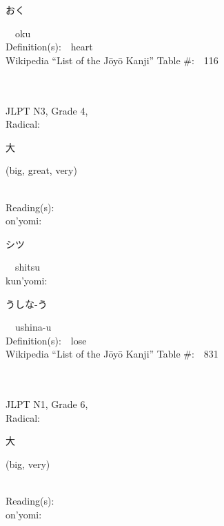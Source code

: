 \begin{multicols}{2}
{\hspace*{2em}}{\begin{CJK}{UTF8}{min} おく \end{CJK}}\ \ oku\ \ \\
Definition(s):\ \ heart \\
Wikipedia ``List of the J\=oy\=o Kanji'' Table \#:\ \ 116 \\
\ \ \\
{\fontsize{34pt}{40pt}  }\ \ \\  %
{JLPT N3, Grade 4, \\Radical:\ \ {\begin{CJK}{UTF8}{min} 大 \end{CJK}} (big, great, very) } \\
Reading(s):\ \ \\
{\hspace*{1em}}on'yomi:\ \ \\
{\hspace*{2em}}{\begin{CJK}{UTF8}{min} シツ \end{CJK}}\ \ shitsu\ \ \\
{\hspace*{1em}}kun'yomi:\ \ \\
{\hspace*{2em}}{\begin{CJK}{UTF8}{min} うしな-う \end{CJK}}\ \ ushina-u\ \ \\
Definition(s):\ \ lose \\
Wikipedia ``List of the J\=oy\=o Kanji'' Table \#:\ \ 831 \\
\ \ \\
{\fontsize{34pt}{40pt}  }\ \ \\  %
{JLPT N1, Grade 6, \\Radical:\ \ {\begin{CJK}{UTF8}{min} 大 \end{CJK}} (big, very) } \\
Reading(s):\ \ \\
{\hspace*{1em}}on'yomi:\ \ \\

\end{multicols}
